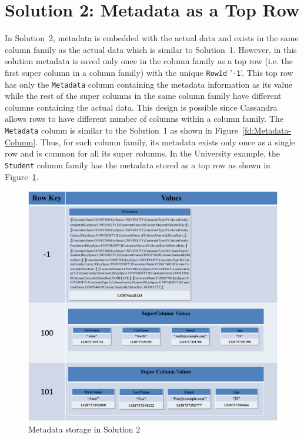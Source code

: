 
\section{Solution 2:  Metadata as a Top Row} \label{s:design-sol2}


In Solution~2,   metadata is embedded with the actual data and exists in the
same column family as the actual data which is similar to Solution~1. 
However,  in this solution   metadata is saved only once in the column family as
a top row (i.e. the first super column in a column family) with the unique
\texttt{RowId} '\texttt{-1}'.  This top row has only the \texttt{Metadata} 
column containing the metadata information as its value while the rest of the
super columns in the same column family have different columns containing the
actual data.  This design is possible since Cassandra allows rows to have
different number of columns within a column family.  The \texttt{Metadata}
column is similar to the Solution~1 as shown in Figure~\ref{fd:Metadata-Column}.  Thus,  for
each column family,  its metadata exists only once as a single row and is common
for all its super columns.  In the University example, the  \texttt{Student}
column family has the metadata  stored as a top row as  shown in
Figure~\ref{fd:Metadata-Solution2}.  
		 
	\begin{figure}[h]  
		\centering 
		\includegraphics[width=.8\textwidth]{./figure/Solutions/Sol2-MD-ColumnFamily.png}
		\caption{Metadata storage in Solution 2}\label{fd:Metadata-Solution2}
	\end{figure}
		

